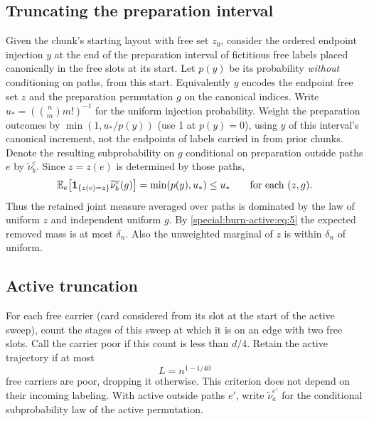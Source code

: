 \subsection{Truncating the preparation interval} Given the chunk's starting layout with free set \(z_0\), consider the ordered endpoint injection \(y\) at the end of the preparation interval of fictitious free labels placed canonically in the free slots at its start. Let \(p(y)\) be its probability \emph{without} conditioning on paths, from this start. Equivalently \(y\) encodes the endpoint free set \(z\) and the preparation permutation \(g\) on the canonical indices. Write \(u_*=(\binom{n}{m}m!)^{-1}\) for the uniform injection probability. Weight the preparation outcomes by \(\min(1,u_*/p(y))\) (use 1 at \(p(y)=0\)), using \(y\) of this interval's canonical increment, not the endpoints of labels carried in from prior chunks. Denote the resulting subprobability on \(g\) conditional on preparation outside paths \(e\) by \(\widetilde\nu_b^e\). Since \(z=z(e)\) is determined by those paths,
\begin{equation}
 \mathbb E_e\big[{\bf 1}_{\{z(e)=z\}}\widetilde\nu_b^e(g)\big]
 =\min(p(y),u_*)\le u_* \qquad\text{for each }(z,g). \label{special:burn-active:eq:6}
\end{equation}
Thus the retained joint measure averaged over paths is dominated by the law of uniform \(z\) and independent uniform \(g\). By \eqref{special:burn-active:eq:5} the expected removed mass is at most \(\delta_n\). Also the unweighted marginal of \(z\) is within \(\delta_n\) of uniform.

\subsection{Active truncation} For each free carrier (card considered from its slot at the start of the active sweep), count the stages of this sweep at which it is on an edge with two free slots. Call the carrier poor if this count is less than \(d/4\). Retain the active trajectory if at most
\[
 L=n^{1-1/40}
\]
free carriers are poor, dropping it otherwise. This criterion does not depend on their incoming labeling. With active outside paths \(e'\), write \(\widetilde\nu_a^{e'}\) for the conditional subprobability law of the active permutation.

